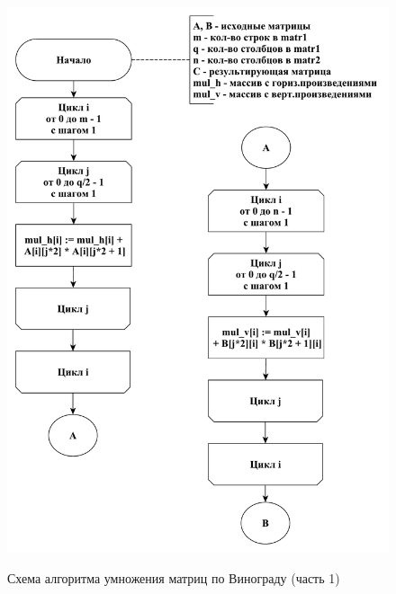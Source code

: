 \documentclass[a4paper,12pt]{article}
\begin{document}
        \begin{figure}[h!]
        	\begin{center}
        		{\includegraphics[scale = 0.5]{schema06.pdf}}
        		\caption{Схема алгоритма умножения матриц по Винограду (часть 1)}
        		\label{fig:schema_mult_v_1}
        	\end{center}
        \end{figure}
        
\end{document}
